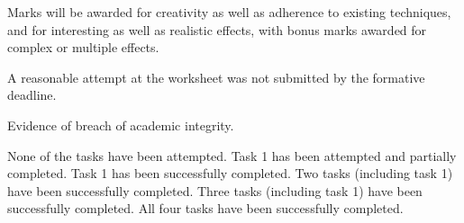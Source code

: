 \documentclass{../../../fal_assignment}
\begin{document}
Marks will be awarded for creativity as well as adherence to existing techniques, and for interesting as well as realistic effects, with bonus marks awarded for complex or multiple effects.

\begin{markingrubric}

		\grade\fail	A reasonable attempt at the worksheet was not submitted by the formative deadline.
		\par Evidence of breach of academic integrity.
		
        \grade\fail None of the tasks have been attempted.
		\grade Task 1 has been attempted and partially completed.
		\grade Task 1 has been successfully completed.
		\grade Two tasks (including task 1) have been successfully completed.
		\grade Three tasks (including task 1) have been successfully completed.
		\grade All four tasks have been successfully completed.


\end{markingrubric}
\end{document}
